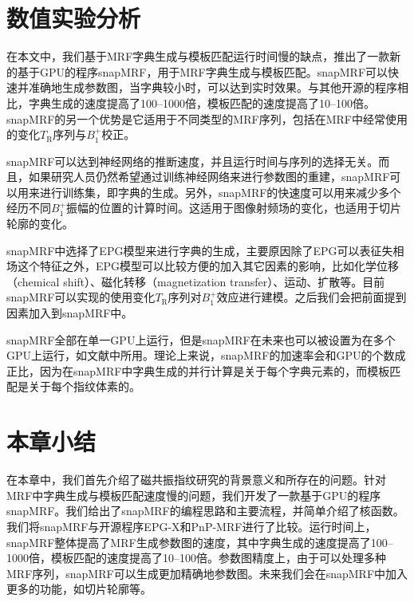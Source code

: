 \section{数值实验分析}
在本文中，我们基于MRF字典生成与模板匹配运行时间慢的缺点，推出了一款新的基于GPU的程序snapMRF，用于MRF字典生成与模板匹配。snapMRF可以快速并准确地生成参数图，当字典较小时，可以达到实时效果。与其他开源的程序相比，字典生成的速度提高了100--1000倍，模板匹配的速度提高了10--100倍。snapMRF的另一个优势是它适用于不同类型的MRF序列，包括在MRF中经常使用的变化$T_\mathrm{R}$序列与$B_1^+$校正。

snapMRF可以达到神经网络的推断速度，并且运行时间与序列的选择无关。而且，如果研究人员仍然希望通过训练神经网络来进行参数图的重建，snapMRF可以用来进行训练集，即字典的生成。另外，snapMRF的快速度可以用来减少多个经历不同$B_1^+$振幅的位置的计算时间。这适用于图像射频场的变化，也适用于切片轮廓\cite{Ma_B1_MRF}的变化。

snapMRF中选择了EPG模型来进行字典的生成，主要原因除了EPG可以表征失相场这个特征之外，EPG模型可以比较方便的加入其它因素的影响，比如化学位移（chemical shift）、磁化转移（magnetization transfer）\cite{Hamilton}、运动、扩散等。目前snapMRF可以实现的使用变化$T_\mathrm{R}$序列对$B_1^+$效应进行建模。之后我们会把前面提到因素加入到snapMRF中。

snapMRF全部在单一GPU上运行，但是snapMRF在未来也可以被设置为在多个GPU上运行，如文献\cite{tron}中所用。理论上来说，snapMRF的加速率会和GPU的个数成正比，因为在snapMRF中字典生成的并行计算是关于每个字典元素的，而模板匹配是关于每个指纹体素的。

\section{本章小结}
在本章中，我们首先介绍了磁共振指纹研究的背景意义和所存在的问题。针对MRF中字典生成与模板匹配速度慢的问题，我们开发了一款基于GPU的程序snapMRF。我们给出了snapMRF的编程思路和主要流程，并简单介绍了核函数。我们将snapMRF与开源程序EPG-X和PnP-MRF进行了比较。运行时间上，snapMRF整体提高了MRF生成参数图的速度，其中字典生成的速度提高了100--1000倍，模板匹配的速度提高了10--100倍。参数图精度上，由于可以处理多种MRF序列，snapMRF可以生成更加精确地参数图。未来我们会在snapMRF中加入更多的功能，如切片轮廓等。





















